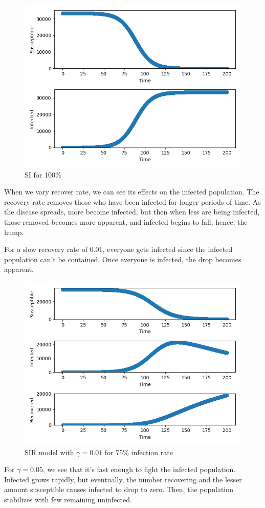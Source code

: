 \documentclass[12pt]{article}
\begin{document}
\begin{figure}[H]
    \centering
    \includegraphics[width=0.6\linewidth]{100per.png}
    \caption{SI for 100\%}
\end{figure}

When we vary recover rate, we can see its effects on the infected population. The recovery rate removes those who have been infected for longer periods of time. As the disease spreads, more become infected, but then when less are being infected, those removed becomes more apparent, and infected begins to fall; hence, the hump.

For a slow recovery rate of 0.01, everyone gets infected since the infected population can’t be contained. Once everyone is infected, the drop becomes apparent.

\begin{figure}[H]
    \centering
    \includegraphics[width=0.6\linewidth]{g0p01.png}
    \caption{SIR model with $\gamma = 0.01$ for 75\% infection rate}
\end{figure}

For $\gamma = 0.05$, we see that it’s fast enough to fight the infected population. Infected grows rapidly, but eventually, the number recovering and the lesser amount susceptible causes infected to drop to zero. Then, the population stabilizes with few remaining uninfected.
\end{document}
